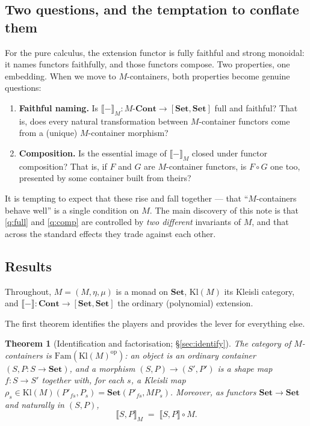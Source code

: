 \documentclass[11pt]{amsart}
\theoremstyle{plain}
\newtheorem{theorem}{Theorem}[section]
\theoremstyle{definition}
\newcommand{\Set}{\mathbf{Set}}
\newcommand{\Cont}{\mathbf{Cont}}
\newcommand{\Fam}{\mathrm{Fam}}
\newcommand{\Kl}{\mathrm{Kl}}
\newcommand{\op}{\mathrm{op}}
\newcommand{\ext}[1]{\llbracket #1 \rrbracket}
\newcommand{\extM}[1]{\llbracket #1 \rrbracket_{M}}
\begin{document}
\subsection*{Two questions, and the temptation to conflate them}
For the pure calculus, the extension functor is fully faithful and strong monoidal: it names
functors faithfully, and those functors compose. Two properties, one embedding. When we move to
$M$-containers, both properties become genuine questions:
\begin{enumerate}[label=(Q\arabic*)]
\item\label{q:full} \textbf{Faithful naming.} Is $\extM{-}\colon M\text{-}\Cont\to[\Set,\Set]$
  full and faithful? That is, does every natural transformation between $M$-container functors come
  from a (unique) $M$-container morphism?
\item\label{q:comp} \textbf{Composition.} Is the essential image of $\extM{-}$ closed under functor
  composition? That is, if $F$ and $G$ are $M$-container functors, is $F\circ G$ one too, presented
  by some container built from theirs?
\end{enumerate}
It is tempting to expect that these rise and fall together --- that ``$M$-containers behave well''
is a single condition on $M$. The main discovery of this note is that \ref{q:full} and \ref{q:comp}
are controlled by \emph{two different} invariants of $M$, and that across the standard effects they
trade against each other.

\subsection*{Results}
Throughout, $M=(M,\eta,\mu)$ is a monad on $\Set$, $\Kl(M)$ its Kleisli category, and
$\ext{-}\colon\Cont\to[\Set,\Set]$ the ordinary (polynomial) extension.

The first theorem identifies the players and provides the lever for everything else.

\begin{theorem}[Identification and factorisation; \S\ref{sec:identify}]\label{thm:1}
The category of $M$-containers is $\Fam(\Kl(M)^{\op})$: an object is an ordinary container
$(S,P\colon S\to\Set)$, and a morphism $(S,P)\to(S',P')$ is a shape map $f\colon S\to S'$ together
with, for each $s$, a Kleisli map $\rho_s\in\Kl(M)(P'_{fs},P_s)=\Set(P'_{fs},MP_s)$. Moreover, as
functors $\Set\to\Set$ and naturally in $(S,P)$,
\[
  \extM{S,P}\;=\;\ext{S,P}\circ M .
\]
\end{theorem}
\end{document}

